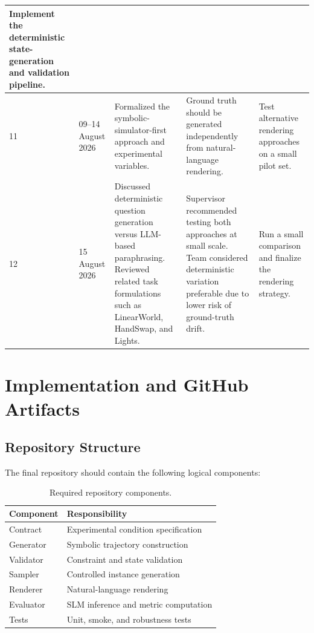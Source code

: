\documentclass{iutbscthesis}
\begin{document}
\begin{appendices}
\begin{longtable}{@{}p{}p{}p{}p{}p{}@{}}
Implement the deterministic state-generation and validation pipeline. \\
\hline
11 & 09--14 August 2026 &
Formalized the symbolic-simulator-first approach and experimental variables. &
Ground truth should be generated independently from natural-language rendering. &
Test alternative rendering approaches on a small pilot set. \\
\hline
12 & 15 August 2026 &
Discussed deterministic question generation versus LLM-based paraphrasing. Reviewed related task
formulations such as LinearWorld, HandSwap, and Lights. &
Supervisor recommended testing both approaches at small scale. Team considered deterministic
variation preferable due to lower risk of ground-truth drift. &
Run a small comparison and finalize the rendering strategy. \\
\hline
\end{longtable}
\endgroup

\chapter{Implementation and GitHub Artifacts}
\section{Repository Structure}
The final repository should contain the following logical components:
\begin{table}[H]
\centering
\begin{tabular}{ll}
\toprule
\textbf{Component} & \textbf{Responsibility} \\
\midrule
Contract & Experimental condition specification \\
Generator & Symbolic trajectory construction \\
Validator & Constraint and state validation \\
Sampler & Controlled instance generation \\
Renderer & Natural-language rendering \\
Evaluator & SLM inference and metric computation \\
Tests & Unit, smoke, and robustness tests \\
\bottomrule
\end{tabular}
\caption{Required repository components.}
\label{tab:repository-components}
\end{table}


\end{appendices}
\end{document}
